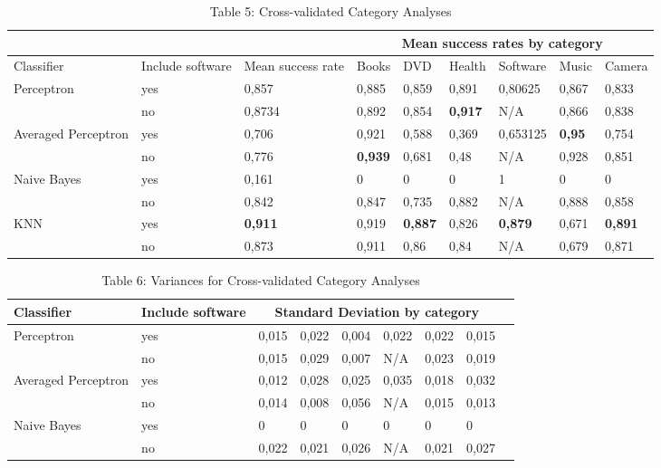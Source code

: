 \begin{table}[htdp]
\caption*{Table 5: Cross-validated Category Analyses}
\begin{tabular}{ | p{2cm} | p{1.5cm} | p{1.5cm} | l | l | l | l | l | l | }
\hline
                    &       &           &\multicolumn{6}{|c|}{Mean success rates by category} \\ \hline
Classifier          & Include software & Mean success rate & Books & DVD & Health & Software & Music & Camera \\ \hline
Perceptron          & yes   & 0,857 & 0,885 & 0,859 & 0,891 & 0,80625 & 0,867 & 0,833 \\
                    & no    & 0,8734 & 0,892 & 0,854 & \textbf{0,917} & N/A & 0,866 & 0,838 \\ \hline
\multirow{2}{2cm}{Averaged Perceptron} & yes   & 0,706  & 0,921 & 0,588 & 0,369 & 0,653125  & \textbf{0,95}  & 0,754 \\
                     & no    & 0,776 & \textbf{0,939} & 0,681 & 0,48  & N/A & 0,928 & 0,851 \\ \hline
Naive Bayes         & yes   & 0,161 & 0 & 0 & 0 & 1 & 0 & 0 \\
                     & no    & 0,842  & 0,847 & 0,735 &  0,882 & N/A &  0,888 & 0,858 \\ \hline
KNN                 & yes   & \textbf{0,911} & 0,919  & \textbf{0,887} & 0,826  & \textbf{0,879}  & 0,671 & \textbf{0,891} \\
                 & no    &  0,873 & 0,911 & 0,86  & 0,84  & N/A &0,679  &0,871 \\ \hline



\end{tabular}
\label{default}
\end{table}



\begin{table}[htdp]
\caption*{Table 6: Variances for Cross-validated Category Analyses}
\begin{tabular}{ | p{2cm} | p{1.5cm} | l | l | l | l | l | l | l | }
\hline
Classifier          & Include software &\multicolumn{6}{|c|}{Standard Deviation by category} \\ \hline
Perceptron & yes & 0,015 & 0,022 & 0,004 & 0,022 & 0,022 & 0,015\\
          & no & 0,015 & 0,029 & 0,007 & N/A & 0,023 & 0,019\\ \hline
\multirow{2}{2cm}{Averaged Perceptron}  & yes & 0,012 & 0,028 & 0,025 & 0,035 & 0,018 & 0,032\\
 & no & 0,014 & 0,008 & 0,056 & N/A & 0,015 & 0,013\\ \hline
Naive Bayes & yes & 0 & 0 & 0 & 0 & 0 & 0\\
 & no & 0,022 & 0,021 & 0,026 & N/A  & 0,021 & 0,027\\ \hline


\end{tabular}
\label{default}
\end{table}


